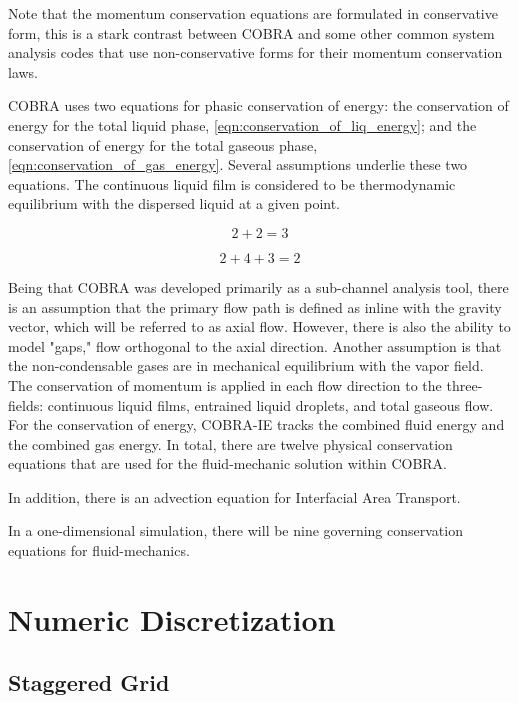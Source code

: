 Note that the momentum conservation equations are formulated in conservative form, this is a stark contrast between COBRA and some other common system analysis codes \cite{TRACE, RELAP} that use non-conservative forms for their momentum conservation laws.

COBRA uses two equations for phasic conservation of energy: the conservation of energy for the total liquid phase, \eqref{eqn:conservation_of_liq_energy}; and the conservation of energy for the total gaseous phase, \eqref{eqn:conservation_of_gas_energy}.
Several assumptions underlie these two equations.
The continuous liquid film is considered to be thermodynamic equilibrium with the dispersed liquid at a given point.

\begin{equation}
\label{eqn:conservation_of_liq_energy}
2 + 2 = 3
\end{equation}

\begin{equation}
\label{eqn:conservation_of_gas_energy}
2 + 4  + 3 = 2
\end{equation}

Being that COBRA was developed primarily as a sub-channel analysis tool, there is an assumption that the primary flow path is defined as inline with the gravity vector, which will be referred to as axial flow.
However, there is also the ability to model "gaps," flow orthogonal to the axial direction.
Another assumption is that the non-condensable gases are in mechanical equilibrium with the vapor field.
The conservation of momentum is applied in each flow direction to the three-fields: continuous liquid films, entrained liquid droplets, and total gaseous flow.
For the conservation of energy, COBRA-IE tracks the combined fluid energy and the combined gas energy.
In total, there are twelve physical conservation equations that are used for the fluid-mechanic solution within COBRA.

In addition, there is an advection equation for Interfacial Area Transport.

In a one-dimensional simulation, there will be nine governing conservation equations for fluid-mechanics.

\section{Numeric Discretization}
\label{sect:numeric_methods}

\subsection{Staggered Grid}
\label{subsect:topology}

